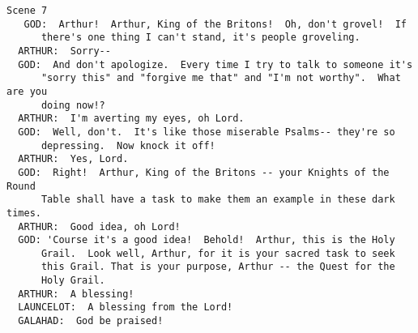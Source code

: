 \documentclass{article}
\begin{document}
\begin{verbatim}
Scene 7
   GOD:  Arthur!  Arthur, King of the Britons!  Oh, don't grovel!  If
      there's one thing I can't stand, it's people groveling.
  ARTHUR:  Sorry--
  GOD:  And don't apologize.  Every time I try to talk to someone it's
      "sorry this" and "forgive me that" and "I'm not worthy".  What are you
      doing now!?
  ARTHUR:  I'm averting my eyes, oh Lord.
  GOD:  Well, don't.  It's like those miserable Psalms-- they're so
      depressing.  Now knock it off!
  ARTHUR:  Yes, Lord.
  GOD:  Right!  Arthur, King of the Britons -- your Knights of the Round
      Table shall have a task to make them an example in these dark times.
  ARTHUR:  Good idea, oh Lord!
  GOD: 'Course it's a good idea!  Behold!  Arthur, this is the Holy
      Grail.  Look well, Arthur, for it is your sacred task to seek
      this Grail. That is your purpose, Arthur -- the Quest for the
      Holy Grail.
  ARTHUR:  A blessing!
  LAUNCELOT:  A blessing from the Lord!
  GALAHAD:  God be praised!


\end{verbatim}
\end{document}
